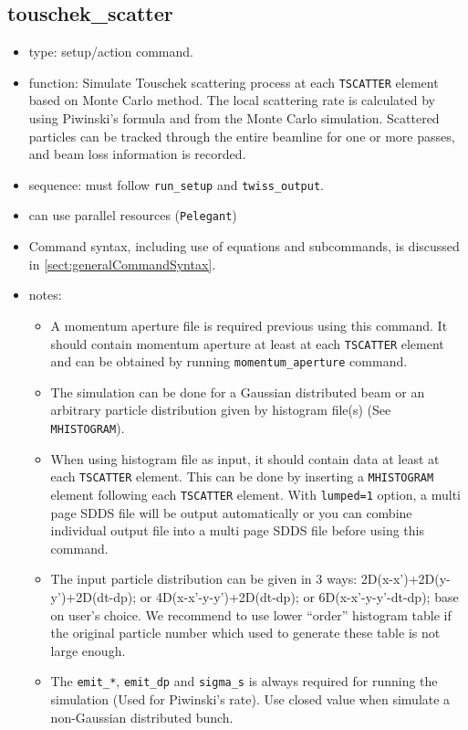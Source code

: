 \documentclass[11pt]{article}
\begin{document}
\subsection{touschek\_scatter \label{subsec:touschekscatter}}
\begin{itemize}
\item type: setup/action command.
\item function: Simulate Touschek scattering process at each \verb|TSCATTER| element 
   based on Monte Carlo method. The local scattering rate is
   calculated by using Piwinski's formula and from the Monte Carlo
   simulation. Scattered particles can be tracked through the entire
   beamline for one or more passes, and beam loss information is recorded.
\item sequence: must follow \verb|run_setup| and \verb|twiss_output|.
\item can use parallel resources (\verb|Pelegant|)
\item Command syntax, including use of equations and subcommands, is discussed in \ref{sect:generalCommandSyntax}.
\item notes: 
	\begin{itemize} 
      \item A momentum aperture file is required previous using this command. It
      should contain momentum aperture at least at each \verb|TSCATTER| element and can be
      obtained by running \verb|momentum_aperture| command. 
      \item The simulation can be done for a Gaussian distributed beam or an arbitrary 
      particle distribution given by histogram file(s) (See \verb|MHISTOGRAM|).  
      \item When using histogram file as input, it should contain data at least at each 
      \verb|TSCATTER| element. This can be done by inserting a \verb|MHISTOGRAM| element 
      following each \verb|TSCATTER| element. With \verb|lumped=1| option, a multi page 
      SDDS file will be output automatically or you can combine individual output file 
      into a multi page SDDS file before using this command.
      \item The input particle distribution can be given in 3 ways: 2D(x-x')+2D(y-y')+2D(dt-dp);
      or 4D(x-x'-y-y')+2D(dt-dp); or 6D(x-x'-y-y'-dt-dp); base on user's choice. We recommend
      to use lower ``order'' histogram table if the original particle number which used to generate
      these table is not large enough.
      \item The \verb|emit_*|, \verb|emit_dp| and \verb|sigma_s| is always required for running
      the simulation (Used for Piwinski's rate). Use closed value when simulate a non-Gaussian 
      distributed bunch. 
	\end{itemize}
\end{itemize}
\end{document}
